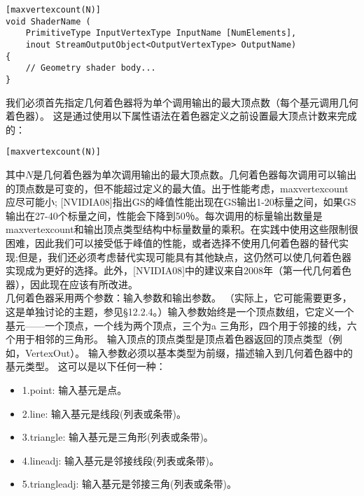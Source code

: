 \begin{lstlisting}
[maxvertexcount(N)]
void ShaderName (
    PrimitiveType InputVertexType InputName [NumElements],
    inout StreamOutputObject<OutputVertexType> OutputName)
{
    // Geometry shader body...
}
\end{lstlisting}

\begin{flushleft}
我们必须首先指定几何着色器将为单个调用输出的最大顶点数（每个基元调用几何着色器）。 这是通过使用以下属性语法在着色器定义之前设置最大顶点计数来完成的：\\
\end{flushleft}

\begin{lstlisting}
[maxvertexcount(N)]
\end{lstlisting}

\begin{flushleft}
其中$N$是几何着色器为单次调用输出的最大顶点数。几何着色器每次调用可以输出的顶点数是可变的，但不能超过定义的最大值。出于性能考虑，maxvertexcount 应尽可能小; [NVIDIA08]指出GS的峰值性能出现在GS输出1-20标量之间，如果GS输出在27-40个标量之间，性能会下降到50％。每次调用的标量输出数量是maxvertexcount和输出顶点类型结构中标量数量的乘积。在实践中使用这些限制很困难，因此我们可以接受低于峰值的性能，或者选择不使用几何着色器的替代实现;但是，我们还必须考虑替代实现可能具有其他缺点，这仍然可以使几何着色器实现成为更好的选择。此外，[NVIDIA08]中的建议来自2008年（第一代几何着色器），因此现在应该有所改进。\\

几何着色器采用两个参数：输入参数和输出参数。 （实际上，它可能需要更多，这是单独讨论的主题，参见§12.2.4。）输入参数始终是一个顶点数组，它定义一个基元——一个顶点，一个线为两个顶点，三个为a 三角形，四个用于邻接的线，六个用于相邻的三角形。 输入顶点的顶点类型是顶点着色器返回的顶点类型（例如，VertexOut）。 输入参数必须以基本类型为前缀，描述输入到几何着色器中的基元类型。 这可以是以下任何一种：\\
\end{flushleft}

\begin{itemize}
  \item 1.point: 输入基元是点。
  \item 2.line: 输入基元是线段(列表或条带)。
  \item 3.triangle: 输入基元是三角形(列表或条带)。
  \item 4.lineadj: 输入基元是邻接线段(列表或条带)。
  \item 5.triangleadj: 输入基元是邻接三角(列表或条带)。
\end{itemize}

